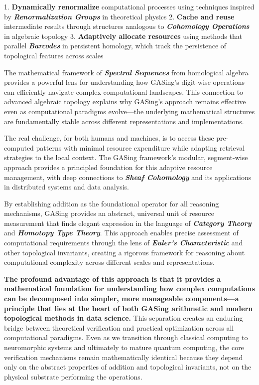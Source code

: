 1. \textbf{Dynamically renormalize} computational processes using techniques inspired by \textbf{\textit{Renormalization Groups}} in theoretical physics
2. \textbf{Cache and reuse} intermediate results through structures analogous to \textbf{\textit{Cohomology Operations}} in algebraic topology
3. \textbf{Adaptively allocate resources} using methods that parallel \textbf{\textit{Barcodes}} in persistent homology, which track the persistence of topological features across scales

The mathematical framework of \textbf{\textit{Spectral Sequences}} from homological algebra provides a powerful lens for understanding how GASing's digit-wise operations can efficiently navigate complex computational landscapes. This connection to advanced algebraic topology explains why GASing's approach remains effective even as computational paradigms evolve—the underlying mathematical structures are fundamentally stable across different representations and implementations.

The real challenge, for both humans and machines, is to access these pre-computed patterns with minimal resource expenditure while adapting retrieval strategies to the local context. The GASing framework's modular, segment-wise approach provides a principled foundation for this adaptive resource management, with deep connections to \textbf{\textit{Sheaf Cohomology}} and its applications in distributed systems and data analysis.

By establishing addition as the foundational operator for all reasoning mechanisms, GASing provides an abstract, universal unit of resource measurement that finds elegant expression in the language of \textbf{\textit{Category Theory}} and \textbf{\textit{Homotopy Type Theory}}. This approach enables precise assessment of computational requirements through the lens of \textbf{\textit{Euler's Characteristic}} and other topological invariants, creating a rigorous framework for reasoning about computational complexity across different scales and representations.

\textbf{The profound advantage of this approach is that it provides a mathematical foundation for understanding how complex computations can be decomposed into simpler, more manageable components—a principle that lies at the heart of both GASing arithmetic and modern topological methods in data science.} This separation creates an enduring bridge between theoretical verification and practical optimization across all computational paradigms. Even as we transition through classical computing to neuromorphic systems and ultimately to mature quantum computing, the core verification mechanisms remain mathematically identical because they depend only on the abstract properties of addition and topological invariants, not on the physical substrate performing the operations.

